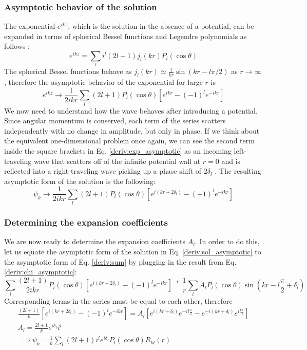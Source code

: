 \subsubsection{Asymptotic behavior of the solution}
The exponential \(e^{ikz} \), which is the solution in the absence of a potential, can be expanded in terms of spherical Bessel functions and Legendre polynomials as follows \cite{cohen-tannoudji}:
\begin{equation}
	e^{ikz} = \sum_{l} i^l (2l+1) j_l(kr)P_l(\cos \theta )
\end{equation}
The spherical Bessel functions behave as \(j_l(kr) \simeq \frac{1}{kr} \sin \left(kr - l \pi /2\right)\) as \(r \to \infty \), therefore the asymptotic behavior of the exponential for large \(r\) is
\begin{equation}\label{deriv:exp_asymptotic}
	e^{ikz} \to  \frac{1}{2ikr} \sum_{l} (2l+1) P_l (\cos \theta ) \left[ e^{ikr}  - (-1)^l e^{-ikr} \right]
\end{equation}
We now need to understand how the wave behaves after introducing a potential. Since angular momentum is conserved, each term of the series scatters independently with no change in amplitude, but only in phase. If we think about the equivalent one-dimensional problem once again, we can see the second term inside the square brackets in Eq. \eqref{deriv:exp_asymptotic} as an incoming left-traveling wave that scatters off of the infinite potential wall at \(r=0\) and is reflected into a right-traveling wave picking up a phase shift of \(2\delta _l\) \cite{griffiths}. The resulting asymptotic form of the solution is the following:
\begin{equation}\label{deriv:sol_asymptotic}
	\psi_k \to \frac{1}{2ikr}\sum_{l} (2l+1)P_l(\cos \theta )\left[e^{i(kr+2\delta _l)}- (-1)^l e^{-ikr}  \right]
\end{equation}

\subsubsection{Determining the expansion coefficients}
We are now ready to determine the expansion coefficients \(A_l\). In order to do this, let us equate the asymptotic form of the solution in Eq. \eqref{deriv:sol_asymptotic} to the asymptotic form of Eq. \eqref{deriv:sum} by plugging in the result from Eq. \eqref{deriv:chi_asymptotic}:
\begin{equation}
	\sum_{l} \frac{(2l+1)}{2ikr} P_l(\cos \theta ) \left[e^{i(kr + 2 \delta _l)} - (-1)^{l} e^{-ikr} \right] \overset{!}{=} \frac{1}{r} \sum_{l} A_l P_l(\cos \theta ) \sin (kr-l \frac{\pi}{2} + \delta _l)
\end{equation}
Corresponding terms in the series must be equal to each other, therefore
\begin{gather}
	\frac{(2l+1)}{k}\left[ e^{i(kr+2\delta _l)}-(-1)^l e^{-ikr} \right]
	=
	A_l \left[e^{i(kr + \delta _l)} e^{- il \frac{\pi }{2} } - e^{-i(kr + \delta _l)}e^{il \frac{\pi }{2}} \right]\\
	A_l = \frac{2l+1}{k} e^{i \delta _l} i^l\\
	\implies 
	\psi _k = \frac{1}{k} \sum_{l} (2l+1)i^l e^{i \delta _l} P_l (\cos \theta ) R_{kl} (r)
\end{gather}

